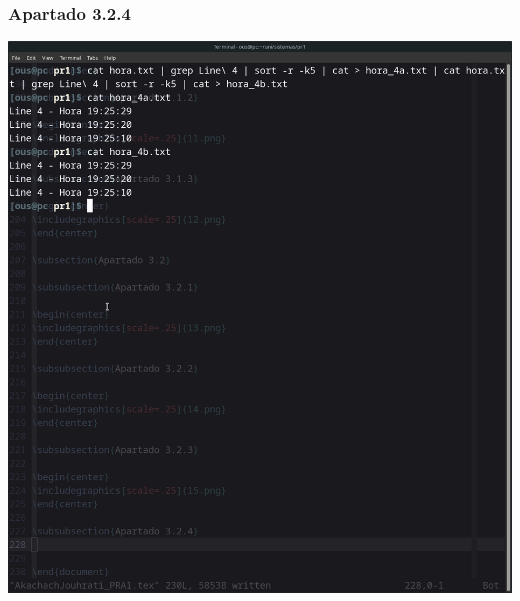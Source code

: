 \documentclass[spanish]{article}
\begin{document}
\newpage

\subsubsection{Apartado 3.2.4}

\begin{center}
\includegraphics[scale=.25]{../img/16.png}
\end{center}
\end{document}
